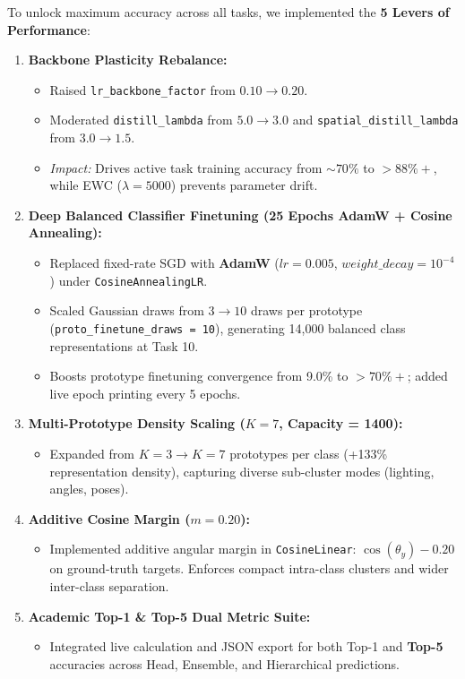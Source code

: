 \documentclass[11pt,a4paper]{article}
\begin{document}
    To unlock maximum accuracy across all tasks, we implemented the \textbf{5 Levers of Performance}:
    \begin{enumerate}[leftmargin=*]
        \item \textbf{Backbone Plasticity Rebalance:}
        \begin{itemize}
            \item Raised \texttt{lr\_backbone\_factor} from $0.10 \to 0.20$.
            \item Moderated \texttt{distill\_lambda} from $5.0 \to 3.0$ and \texttt{spatial\_distill\_lambda} from $3.0 \to 1.5$.
            \item \textit{Impact:} Drives active task training accuracy from $\sim 70\%$ to \textbf{$>88\%+$}, while EWC ($\lambda=5000$) prevents parameter drift.
        \end{itemize}
        \item \textbf{Deep Balanced Classifier Finetuning (25 Epochs AdamW + Cosine Annealing):}
        \begin{itemize}
            \item Replaced fixed-rate SGD with \textbf{AdamW} ($lr=0.005$, $weight\_decay=10^{-4}$) under \texttt{CosineAnnealingLR}.
            \item Scaled Gaussian draws from $3 \to 10$ draws per prototype (\texttt{proto\_finetune\_draws = 10}), generating 14,000 balanced class representations at Task 10.
            \item Boosts prototype finetuning convergence from 9.0\% to \textbf{$>70\%+$}; added live epoch printing every 5 epochs.
        \end{itemize}
        \item \textbf{Multi-Prototype Density Scaling ($K=7$, Capacity = 1400):}
        \begin{itemize}
            \item Expanded from $K=3 \to K=7$ prototypes per class (+133\% representation density), capturing diverse sub-cluster modes (lighting, angles, poses).
        \end{itemize}
        \item \textbf{Additive Cosine Margin ($m = 0.20$):}
        \begin{itemize}
            \item Implemented additive angular margin in \texttt{CosineLinear}: $\cos(\theta_y) - 0.20$ on ground-truth targets. Enforces compact intra-class clusters and wider inter-class separation.
        \end{itemize}
        \item \textbf{Academic Top-1 \& Top-5 Dual Metric Suite:}
        \begin{itemize}
            \item Integrated live calculation and JSON export for both Top-1 and \textbf{Top-5} accuracies across Head, Ensemble, and Hierarchical predictions.
        \end{itemize}
    \end{enumerate}
\end{document}
